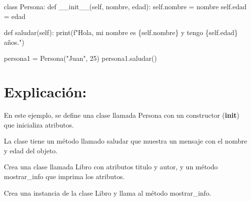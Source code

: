 \documentclass[
  a4paper,
  DIV=11,
  numbers=noendperiod,
  onepage,
  openany]{scrreprt}
\newenvironment{Shaded}{\begin{snugshade}}{\end{snugshade}}
\newcommand{\BuiltInTok}[1]{\textcolor[rgb]{0.00,0.23,0.31}{#1}}
\newcommand{\DecValTok}[1]{\textcolor[rgb]{0.68,0.00,0.00}{#1}}
\newcommand{\FunctionTok}[1]{\textcolor[rgb]{0.28,0.35,0.67}{#1}}
\newcommand{\KeywordTok}[1]{\textcolor[rgb]{0.00,0.23,0.31}{#1}}
\newcommand{\NormalTok}[1]{\textcolor[rgb]{0.00,0.23,0.31}{#1}}
\newcommand{\OperatorTok}[1]{\textcolor[rgb]{0.37,0.37,0.37}{#1}}
\newcommand{\SpecialCharTok}[1]{\textcolor[rgb]{0.37,0.37,0.37}{#1}}
\newcommand{\SpecialStringTok}[1]{\textcolor[rgb]{0.13,0.47,0.30}{#1}}
\newcommand{\StringTok}[1]{\textcolor[rgb]{0.13,0.47,0.30}{#1}}
\newcommand{\VariableTok}[1]{\textcolor[rgb]{0.07,0.07,0.07}{#1}}
\begin{document}
\begin{Shaded}
\begin{Highlighting}[]
\KeywordTok{class}\NormalTok{ Persona:}
    \KeywordTok{def} \FunctionTok{\_\_init\_\_}\NormalTok{(}\VariableTok{self}\NormalTok{, nombre, edad):}
        \VariableTok{self}\NormalTok{.nombre }\OperatorTok{=}\NormalTok{ nombre}
        \VariableTok{self}\NormalTok{.edad }\OperatorTok{=}\NormalTok{ edad}

    \KeywordTok{def}\NormalTok{ saludar(}\VariableTok{self}\NormalTok{):}
        \BuiltInTok{print}\NormalTok{(}\SpecialStringTok{f"Hola, mi nombre es }\SpecialCharTok{\{}\VariableTok{self}\SpecialCharTok{.}\NormalTok{nombre}\SpecialCharTok{\}}\SpecialStringTok{ y tengo }\SpecialCharTok{\{}\VariableTok{self}\SpecialCharTok{.}\NormalTok{edad}\SpecialCharTok{\}}\SpecialStringTok{ años."}\NormalTok{)}

\NormalTok{persona1 }\OperatorTok{=}\NormalTok{ Persona(}\StringTok{"Juan"}\NormalTok{, }\DecValTok{25}\NormalTok{)}
\NormalTok{persona1.saludar()}
\end{Highlighting}
\end{Shaded}

\hypertarget{explicaciuxf3n-48}{%
\section{Explicación:}\label{explicaciuxf3n-48}}

En este ejemplo, se define una clase llamada Persona con un constructor
(\textbf{init}) que inicializa atributos.

La clase tiene un método llamado saludar que muestra un mensaje con el
nombre y edad del objeto.

\begin{tcolorbox}[enhanced jigsaw, colbacktitle=quarto-callout-important-color!10!white, toprule=.15mm, leftrule=.75mm, titlerule=0mm, opacityback=0, rightrule=.15mm, opacitybacktitle=0.6, breakable, left=2mm, coltitle=black, title=\textcolor{quarto-callout-important-color}{\faExclamation}\hspace{0.5em}{Actividad Práctica:}, toptitle=1mm, bottomtitle=1mm, arc=.35mm, bottomrule=.15mm, colback=white, colframe=quarto-callout-important-color-frame]

Crea una clase llamada Libro con atributos titulo y autor, y un método
mostrar\_info que imprima los atributos.

Crea una instancia de la clase Libro y llama al método mostrar\_info.

\end{tcolorbox}
\end{document}
